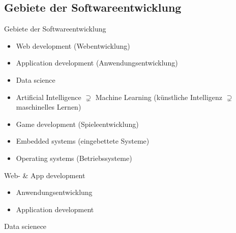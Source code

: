 \subsection{Gebiete der Softwareentwicklung}

\begin{frame}{Gebiete der Softwareentwicklung}
    \begin{itemize}
        \item Web development (Webentwicklung)
        \item Application development (Anwendungsentwicklung)
        \item Data science
        \item Artificial Intelligence $\supsetneq$ Machine Learning
              (künstliche Intelligenz $\supsetneq$ maschinelles Lernen)
        \item Game development (Spieleentwicklung)
        \item Embedded systems (eingebettete Systeme)
        \item Operating systems (Betriebssysteme)
    \end{itemize}

\end{frame}

\begin{frame}{Web- \& App development}
    \begin{itemize}
        \item Anwendungsentwicklung
        \item Application development
    \end{itemize}

    \note{

    }
\end{frame}

\begin{frame}{Data scienece}


    \note{

    }
\end{frame}

